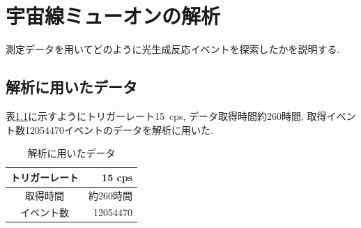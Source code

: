 \chapter{宇宙線ミューオンの解析}\label{analysis}
測定データを用いてどのように光生成反応イベントを探索したかを説明する.

\section{解析に用いたデータ}\label{sec:anal:data}
表\ref{tab:analyzed_data}に示すようにトリガーレート15\ cps, データ取得時間約260時間, 取得イベント数12054470イベントのデータを解析に用いた.
\begin{table}[H]
    \centering
    \caption{解析に用いたデータ}
    \label{tab:analyzed_data}
    \begin{tabular}{|c|r|}
        \hline
        トリガーレート & 15 cps    \\ \hline
        取得時間       & 約260時間 \\ \hline
        イベント数     & 12054470  \\ \hline
    \end{tabular}
\end{table}

